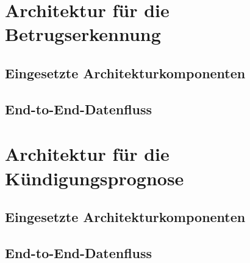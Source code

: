 \section{Architektur für die Betrugserkennung}
\label{sec:integration-use-cases}
\label{sec:architektur-fraud}

\subsection{Eingesetzte Architekturkomponenten}

\subsection{End-to-End-Datenfluss}

\section{Architektur für die Kündigungsprognose}
\label{sec:architektur-churn}

\subsection{Eingesetzte Architekturkomponenten}

\subsection{End-to-End-Datenfluss}
